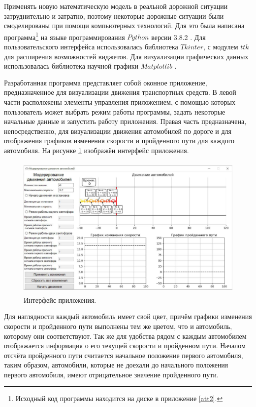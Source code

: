 \documentclass[12pt, a4paper]{extarticle}
\numberwithin{equation}{section}
\numberwithin{figure}{section}
\begin{document}
Применять новую математическую модель в реальной дорожной ситуации затруднительно и затратно, поэтому некоторые дорожные ситуации были смоделированы при помощи компьютерных технологий. Для это была написана программа\footnote{Исходный код программы находится на диске в приложение \ref{att2}.} на языке программирования $Python$ версии 3.8.2 \cite{Python}. Для пользовательского интерфейса использовалась библиотека $Tkinter$, с модулем $ttk$ для расширения возможностей виджетов. Для визуализации графических данных использовалась библиотека научной графики $Matplotlib$ \cite{Matplotlib}.

Разработанная программа представляет собой оконное приложение, предназначенное для визуализации движения транспортных средств. В левой части расположены элементы управления приложением, с помощью которых пользователь может выбрать режим работы программы, задать некоторые начальные данные и запустить работу приложения. Правая часть предназначена, непосредственно, для визуализации движения автомобилей по дороге и для отображения графиков изменения скорости и пройденного пути для каждого автомобиля. На рисунке \ref{window} изображён интерфейс приложения. 

\begin{figure}[h!]  
	\begin{center}
		\includegraphics[keepaspectratio,width=160mm,height=70mm]
		{Images/screens/empty_window.pdf}
	\end{center}
	\caption{Интерфейс приложения.}
	\label{window}
\end{figure}

Для наглядности каждый автомобиль имеет свой цвет, причём графики изменения скорости и пройденного пути выполнены тем же цветом, что и автомобиль, которому они соответствуют. Так же для удобства рядом с каждым автомобилем отображается информация о его текущей скорости и пройденном пути. Началом отсчёта пройденного пути считается начальное положение первого автомобиля, таким образом, автомобили, которые не доехали до начального положения первого автомобиля, имеют отрицательное значение пройденного пути.
\end{document}
